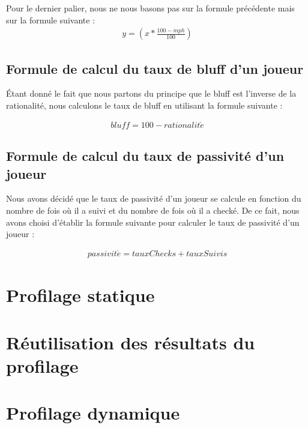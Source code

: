 \documentclass{report}
\begin{document}
Pour le dernier palier, nous ne nous basons pas sur la formule précédente mais sur la formule suivante :\\ 

\begin{align*}
	y=\left(x*\frac{100-mph}{100}\right)
\end{align*}

\subsection{Formule de calcul du taux de bluff d'un joueur}

\hspace{0.5cm}Étant donné le fait que nous partons du principe que le bluff est l'inverse de la rationalité, nous calculons le taux de bluff en utilisant la formule suivante : \par

\begin{align*}
	bluff=100-rationalit\acute{e}
\end{align*}


\subsection{Formule de calcul du taux de passivité d'un joueur}

\hspace{0.5cm}Nous avons décidé que le taux de passivité d'un joueur se calcule en fonction du nombre de fois où il a suivi et du nombre de fois où il a checké. De ce fait, nous avons choisi d'établir la formule suivante pour calculer le taux de passivité d'un joueur : \par
\begin{align*}
	passivit\acute{e}=tauxChecks+tauxSuivis
\end{align*}


\section{Profilage statique}

\section{Réutilisation des résultats du profilage}

\section{Profilage dynamique}
\end{document}
